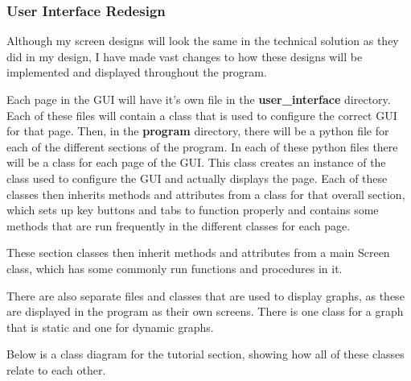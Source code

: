 \documentclass[12pt]{article}
\begin{document}
\subsubsection{User Interface Redesign}
Although my screen designs will look the same in the technical solution as they did in my design, I have made vast changes to how these designs will be implemented and displayed throughout the program.

Each page in the GUI will have it's own file in the \textbf{user\_interface} directory. Each of these files will contain a class that is used to configure the correct GUI for that page. Then, in the \textbf{program} directory, there will be a python file for each of the different sections of the program. In each of these python files there will be a class for each page of the GUI. This class creates an instance of the class used to configure the GUI and actually displays the page. Each of these classes then inherits methods and attributes from a class for that overall section, which sets up key buttons and tabs to function properly and contains some methods that are run frequently in the different classes for each page.

These section classes then inherit methods and attributes from a main Screen class, which has some commonly run functions and procedures in it.

There are also separate files and classes that are used to display graphs, as these are displayed in the program as their own screens. There is one class for a graph that is static and one for dynamic graphs.

Below is a class diagram for the tutorial section, showing how all of these classes relate to each other.
\end{document}
